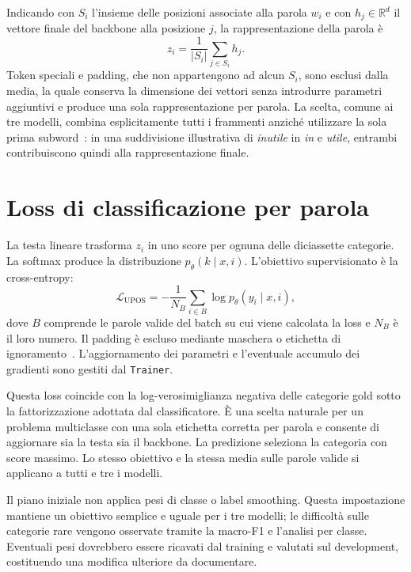 \documentclass[12pt,a4paper]{report}
\begin{document}
Indicando con $S_i$ l'insieme delle posizioni associate alla parola $w_i$ e con $h_j\in\mathbb{R}^{d}$ il vettore finale del backbone alla posizione $j$, la rappresentazione della parola è
\begin{equation}
\label{eq:meanpool}
z_i=\frac{1}{|S_i|}\sum_{j\in S_i}h_j.
\end{equation}
Token speciali e padding, che non appartengono ad alcun $S_i$, sono esclusi dalla media, la quale conserva la dimensione dei vettori senza introdurre parametri aggiuntivi e produce una sola rappresentazione per parola. La scelta, comune ai tre modelli, combina esplicitamente tutti i frammenti anziché utilizzare la sola prima subword~\cite{hfclassification}: in una suddivisione illustrativa di \emph{inutile} in \emph{in} e \emph{utile}, entrambi contribuiscono quindi alla rappresentazione finale.

\newpage
\section{Loss di classificazione per parola}
\label{sec:encoderloss}
La testa lineare trasforma $z_i$ in uno score per ognuna delle diciassette categorie. La softmax produce la distribuzione $p_\theta(k\mid x,i)$. L'obiettivo supervisionato è la cross-entropy:
\begin{equation}
\label{eq:encoderloss}
\mathcal{L}_{\mathrm{UPOS}}=-\frac{1}{N_B}\sum_{i\in B}\log p_\theta(y_i\mid x,i),
\end{equation}
dove $B$ comprende le parole valide del batch su cui viene calcolata la loss e $N_B$ è il loro numero. Il padding è escluso mediante maschera o etichetta di ignoramento~\cite{torchce}. L'aggiornamento dei parametri e l'eventuale accumulo dei gradienti sono gestiti dal \texttt{Trainer}.

Questa loss coincide con la log-verosimiglianza negativa delle categorie gold sotto la fattorizzazione adottata dal classificatore. È una scelta naturale per un problema multiclasse con una sola etichetta corretta per parola e consente di aggiornare sia la testa sia il backbone. La predizione seleziona la categoria con score massimo. Lo stesso obiettivo e la stessa media sulle parole valide si applicano a tutti e tre i modelli.

Il piano iniziale non applica pesi di classe o label smoothing. Questa impostazione mantiene un obiettivo semplice e uguale per i tre modelli; le difficoltà sulle categorie rare vengono osservate tramite la macro-F1 e l'analisi per classe. Eventuali pesi dovrebbero essere ricavati dal training e valutati sul development, costituendo una modifica ulteriore da documentare.
\end{document}
